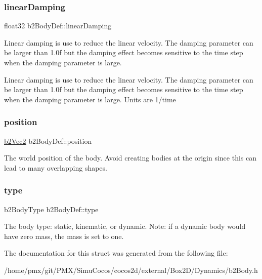 \subsubsection{\texorpdfstring{linear\+Damping}{linearDamping}}
{\footnotesize\ttfamily float32 b2\+Body\+Def\+::linear\+Damping}

Linear damping is use to reduce the linear velocity. The damping parameter can be larger than 1.\+0f but the damping effect becomes sensitive to the time step when the damping parameter is large.

Linear damping is use to reduce the linear velocity. The damping parameter can be larger than 1.\+0f but the damping effect becomes sensitive to the time step when the damping parameter is large. Units are 1/time \mbox{\label{structb2BodyDef_a680cadc09ad6cf4b3366cbf0914c648b}} 
\subsubsection{\texorpdfstring{position}{position}}
{\footnotesize\ttfamily \hyperlink{structb2Vec2}{b2\+Vec2} b2\+Body\+Def\+::position}

The world position of the body. Avoid creating bodies at the origin since this can lead to many overlapping shapes. \mbox{\label{structb2BodyDef_a89cc3ad1873908042b002147b3861381}} 
\subsubsection{\texorpdfstring{type}{type}}
{\footnotesize\ttfamily b2\+Body\+Type b2\+Body\+Def\+::type}

The body type\+: static, kinematic, or dynamic. Note\+: if a dynamic body would have zero mass, the mass is set to one. 

The documentation for this struct was generated from the following file\+:\begin{DoxyCompactItemize}
\item 
/home/pmx/git/\+P\+M\+X/\+Simu\+Cocos/cocos2d/external/\+Box2\+D/\+Dynamics/b2\+Body.\+h\end{DoxyCompactItemize}
